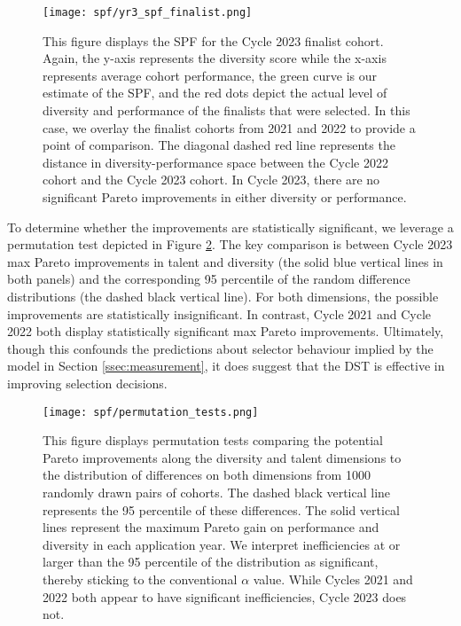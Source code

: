 \begin{figure}[!htb]
    \centering
    \caption{This figure displays the SPF for the Cycle 2023 finalist cohort. Again, the y-axis represents the diversity score while the x-axis represents average cohort performance, the green curve is our estimate of the SPF, and the red dots depict the actual level of diversity and performance of the finalists that were selected. In this case, we overlay the finalist cohorts from 2021 and 2022 to provide a point of comparison. The diagonal dashed red line represents the distance in diversity-performance space between the Cycle 2022 cohort and the Cycle 2023 cohort. In Cycle 2023, there are no significant Pareto improvements in either diversity or performance.} 
    \label{fig:spf_2023}
    \texttt{[image: spf/yr3\_spf\_finalist.png]}
\end{figure}

To determine whether the improvements are statistically significant, we leverage a permutation test depicted in Figure \ref{fig:permutation_tests}. The key comparison is between Cycle 2023 max Pareto improvements in talent and diversity (the solid blue vertical lines in both panels) and the corresponding 95 percentile of the random difference distributions (the dashed black vertical line). For both dimensions, the possible improvements are statistically insignificant. In contrast, Cycle 2021 and Cycle 2022 both display statistically significant max Pareto improvements. Ultimately, though this confounds the predictions about selector behaviour implied by the model in Section \ref{ssec:measurement}, it does suggest that the DST is effective in improving selection decisions.

\begin{figure}[htbp]
    \centering
    \caption{This figure displays permutation tests comparing the potential Pareto improvements along the diversity and talent dimensions to the distribution of differences on both dimensions from 1000 randomly drawn pairs of cohorts. The dashed black vertical line represents the 95 percentile of these differences. The solid vertical lines represent the maximum Pareto gain on performance and diversity in each application year. We interpret inefficiencies at or larger than the 95 percentile of the distribution as significant, thereby sticking to the conventional $\alpha$ value. While Cycles 2021 and 2022 both appear to have significant inefficiencies, Cycle 2023 does not.}
    \label{fig:permutation_tests}
    \texttt{[image: spf/permutation\_tests.png]} 
\end{figure}


